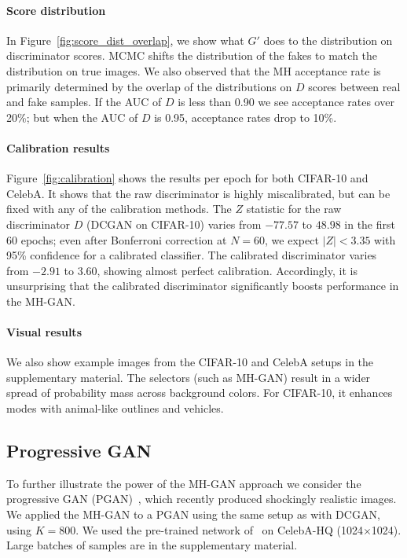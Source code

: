 \documentclass{article}
\begin{document}
\paragraph{Score distribution}
In Figure~\ref{fig:score_dist_overlap}, we show what $G'$ does to the distribution on discriminator scores.
MCMC shifts the distribution of the fakes to match the distribution on true images.
We also observed that the MH acceptance rate is primarily determined by the overlap of the distributions on $D$ scores between real and fake samples.
If the AUC of $D$ is less than 0.90 we see acceptance rates over 20\%; but when the AUC of $D$ is 0.95, acceptance rates drop to 10\%.

\paragraph{Calibration results}
Figure~\ref{fig:calibration} shows the results per epoch for both CIFAR-10 and CelebA\@.
It shows that the raw discriminator is highly miscalibrated, but can be fixed with any of the calibration methods.
The $Z$ statistic for the raw discriminator $D$ (DCGAN on CIFAR-10) varies from $-77.57$ to $48.98$ in the first 60 epochs; even after Bonferroni correction at $N \!\!=\!\! 60$, we expect $|Z| < 3.35$ with 95\% confidence for a calibrated classifier.
The calibrated discriminator varies from $-2.91$ to $3.60$, showing almost perfect calibration.
Accordingly, it is unsurprising that the calibrated discriminator significantly boosts performance in the MH-GAN\@.

\paragraph{Visual results}
We also show example images from the CIFAR-10 and CelebA setups in the supplementary material.
The selectors (such as MH-GAN) result in a wider spread of probability mass across background colors.
For CIFAR-10, it enhances modes with animal-like outlines and vehicles.

\subsection{Progressive GAN}

To further illustrate the power of the MH-GAN approach we consider the progressive GAN (PGAN)~\citep{Karras2017}, which recently produced shockingly realistic images.
We applied the MH-GAN to a PGAN using the same setup as with DCGAN, using $K=800$.
We used the pre-trained network of~\citet{Karras2017} on CelebA-HQ (1024$\times$1024)\@.
Large batches of samples are in the supplementary material.
\end{document}
